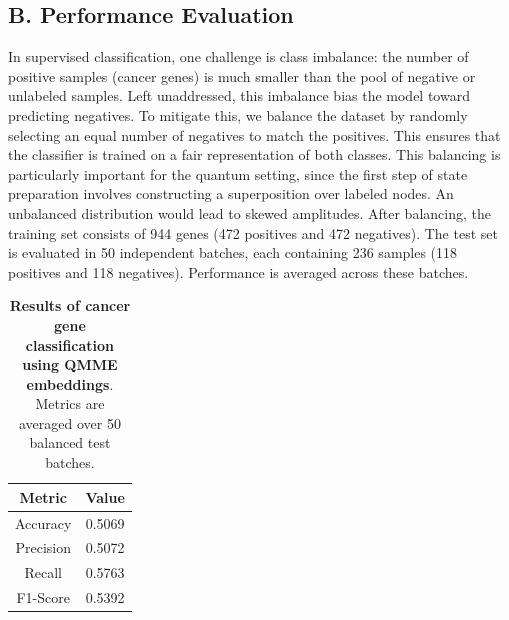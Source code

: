 \documentclass[
  reprint,
  superscriptaddress,
  amsmath,amssymb,
  aps,prl,
]{revtex4-2}
\begin{document}
\subsection{B. Performance Evaluation}
%
%
\noindent In supervised classification, one challenge is class imbalance: the number of positive samples (cancer genes) is much smaller than the pool of negative or unlabeled samples. Left unaddressed, this imbalance bias the model toward predicting negatives. To mitigate this, we balance the dataset by randomly selecting an equal number of negatives to match the positives. This ensures that the classifier is trained on a fair representation of both classes.  
%
This balancing is particularly important for the quantum setting, since the first step of state preparation involves constructing a superposition over labeled nodes. An unbalanced distribution would lead to skewed amplitudes.
%
After balancing, the training set consists of 944 genes (472 positives and 472 negatives). The test set is evaluated in 50 independent batches, each containing 236 samples (118 positives and 118 negatives). Performance is averaged across these batches.  
%
\begin{table}[h]
    \centering
        \caption{\textbf{Results of cancer gene classification using QMME embeddings}. Metrics are averaged over 50 balanced test batches.}
    \begin{tabular}{|c|c|}
        \hline
        \textbf{Metric} & \textbf{Value} \\
        \hline Accuracy & 0.5069\\ 
        \hline Precision & 0.5072\\ 
        \hline Recall & 0.5763\\ 
        \hline F1-Score & 0.5392\\ 
        \hline
    \end{tabular}
\end{table}
%
%
\end{document}
